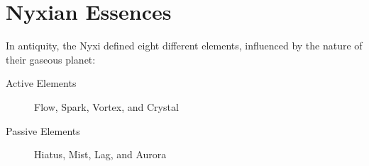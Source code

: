\section{Nyxian Essences}

\begin{remark}
  In antiquity, the Nyxi defined eight different elements, influenced by the nature of their gaseous planet:
  \begin{description}
    \item[Active Elements] Flow, Spark, Vortex, and Crystal
    \item[Passive Elements] Hiatus, Mist, Lag, and Aurora
  \end{description}
\end{remark}